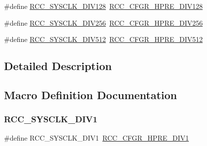 \begin{DoxyCompactItemize}
\item 
\#define \hyperlink{group___r_c_c___a_h_b___clock___source_ga43eddf4d4160df30548a714dce102ad8}{R\+C\+C\+\_\+\+S\+Y\+S\+C\+L\+K\+\_\+\+D\+I\+V128}~\hyperlink{group___peripheral___registers___bits___definition_ga280da821f0da1bec1f4c0e132ddf8eab}{R\+C\+C\+\_\+\+C\+F\+G\+R\+\_\+\+H\+P\+R\+E\+\_\+\+D\+I\+V128}
\item 
\#define \hyperlink{group___r_c_c___a_h_b___clock___source_ga94956d6e9c3a78230bf660b838f987e2}{R\+C\+C\+\_\+\+S\+Y\+S\+C\+L\+K\+\_\+\+D\+I\+V256}~\hyperlink{group___peripheral___registers___bits___definition_ga089930cedd5b2cb201e717438f29d25b}{R\+C\+C\+\_\+\+C\+F\+G\+R\+\_\+\+H\+P\+R\+E\+\_\+\+D\+I\+V256}
\item 
\#define \hyperlink{group___r_c_c___a_h_b___clock___source_gabe18a9d55c0858bbfe3db657fb64c76d}{R\+C\+C\+\_\+\+S\+Y\+S\+C\+L\+K\+\_\+\+D\+I\+V512}~\hyperlink{group___peripheral___registers___bits___definition_gae5088dcbaefc55d4b6693e9b1e595ed0}{R\+C\+C\+\_\+\+C\+F\+G\+R\+\_\+\+H\+P\+R\+E\+\_\+\+D\+I\+V512}
\end{DoxyCompactItemize}


\subsection{Detailed Description}


\subsection{Macro Definition Documentation}
\mbox{\label{group___r_c_c___a_h_b___clock___source_ga226f5bf675015ea677868132b6b83494}} 
\subsubsection{\texorpdfstring{R\+C\+C\+\_\+\+S\+Y\+S\+C\+L\+K\+\_\+\+D\+I\+V1}{RCC\_SYSCLK\_DIV1}}
{\footnotesize\ttfamily \#define R\+C\+C\+\_\+\+S\+Y\+S\+C\+L\+K\+\_\+\+D\+I\+V1~\hyperlink{group___peripheral___registers___bits___definition_ga2b7d7f29b09a49c31404fc0d44645c84}{R\+C\+C\+\_\+\+C\+F\+G\+R\+\_\+\+H\+P\+R\+E\+\_\+\+D\+I\+V1}}

